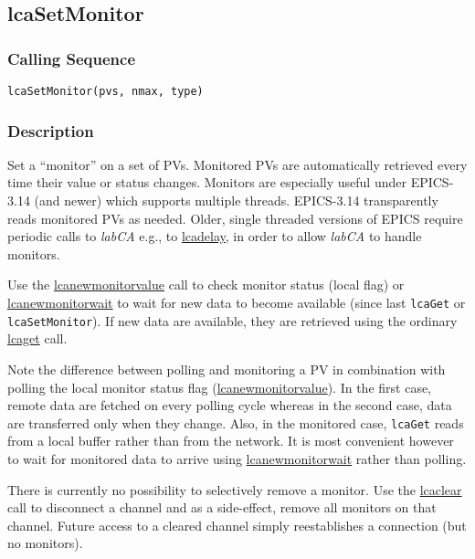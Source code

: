 \documentclass{article}
\newcommand{\sca}{\ita{labCA}}
\newcommand{\com}[1]{{\tt #1}}
\newcommand{\pbrk}{\pagebreak[3]}
\newcommand{\comref}[2]{\hyperref{\com{#1}}{\com{#1} (see }{)}{#2}}
\newcommand{\ita}[1]{\emph{#1}}
\renewcommand{\pbrk}{}
\begin{document}
\pbrk
\subsection{lcaSetMonitor}
\label{lcasetmonitor}
\subsubsection{Calling Sequence}
\begin{verbatim}
lcaSetMonitor(pvs, nmax, type)
\end{verbatim}
\subsubsection{Description}
Set a ``monitor'' on a set of PVs. Monitored PVs are automatically retrieved
every time their value or status changes. 
Monitors are especially useful under EPICS-3.14 (and newer) which supports
multiple threads. EPICS-3.14 transparently reads monitored PVs as needed.
Older, single threaded versions of EPICS require periodic calls to \sca{}
e.g., to \comref{lcaDelay}{lcadelay}, in order to allow \sca{} to handle
monitors.

Use the \comref{lcaNewMonitorValue}{lcanewmonitorvalue} call to check
monitor status (local flag) or \comref{lcaNewMonitorWait}{lcanewmonitorwait}
to wait for new data to become available (since last \com{lcaGet} or \com{lcaSetMonitor}).
If new data are available, they are retrieved using
the ordinary \comref{lcaGet}{lcaget} call.

Note the difference between polling and monitoring a PV in combination with
polling the local monitor status flag (\comref{lcaNewMonitorValue}{lcanewmonitorvalue}).
In the first case, remote data are fetched
on every polling cycle whereas in the second case, data are transferred only
when they change.  Also, in the monitored case, \com{lcaGet} reads from a local
buffer rather than from the network. It is most convenient however to wait
for monitored data to arrive using \comref{lcaNewMonitorWait}{lcanewmonitorwait}
rather than polling.

There is currently no possibility to selectively remove a monitor. Use
the \comref{lcaClear}{lcaclear} call to disconnect a channel and as a side-effect,
remove all monitors on that channel. Future access to a cleared channel
simply reestablishes a connection (but no monitors).
\end{document}
